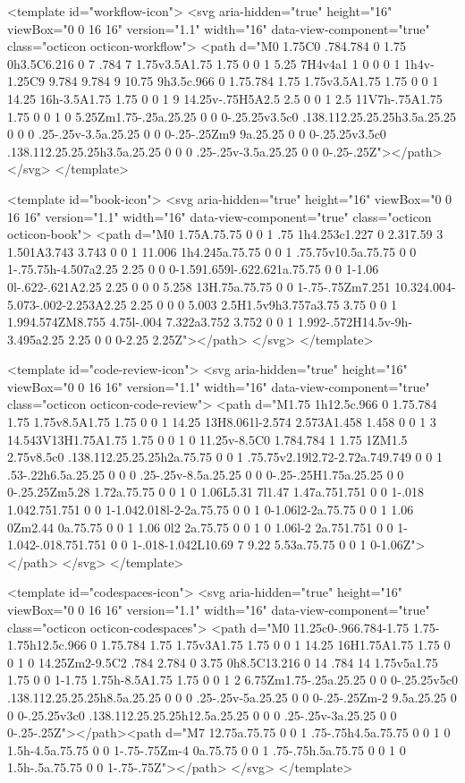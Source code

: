 {{<template id="workflow-icon">
  <svg aria-hidden="true" height="16" viewBox="0 0 16 16" version="1.1" width="16" data-view-component="true" class="octicon octicon-workflow">
    <path d="M0 1.75C0 .784.784 0 1.75 0h3.5C6.216 0 7 .784 7 1.75v3.5A1.75 1.75 0 0 1 5.25 7H4v4a1 1 0 0 0 1 1h4v-1.25C9 9.784 9.784 9 10.75 9h3.5c.966 0 1.75.784 1.75 1.75v3.5A1.75 1.75 0 0 1 14.25 16h-3.5A1.75 1.75 0 0 1 9 14.25v-.75H5A2.5 2.5 0 0 1 2.5 11V7h-.75A1.75 1.75 0 0 1 0 5.25Zm1.75-.25a.25.25 0 0 0-.25.25v3.5c0 .138.112.25.25.25h3.5a.25.25 0 0 0 .25-.25v-3.5a.25.25 0 0 0-.25-.25Zm9 9a.25.25 0 0 0-.25.25v3.5c0 .138.112.25.25.25h3.5a.25.25 0 0 0 .25-.25v-3.5a.25.25 0 0 0-.25-.25Z"></path>
</svg>
</template>

<template id="book-icon">
  <svg aria-hidden="true" height="16" viewBox="0 0 16 16" version="1.1" width="16" data-view-component="true" class="octicon octicon-book">
    <path d="M0 1.75A.75.75 0 0 1 .75 1h4.253c1.227 0 2.317.59 3 1.501A3.743 3.743 0 0 1 11.006 1h4.245a.75.75 0 0 1 .75.75v10.5a.75.75 0 0 1-.75.75h-4.507a2.25 2.25 0 0 0-1.591.659l-.622.621a.75.75 0 0 1-1.06 0l-.622-.621A2.25 2.25 0 0 0 5.258 13H.75a.75.75 0 0 1-.75-.75Zm7.251 10.324.004-5.073-.002-2.253A2.25 2.25 0 0 0 5.003 2.5H1.5v9h3.757a3.75 3.75 0 0 1 1.994.574ZM8.755 4.75l-.004 7.322a3.752 3.752 0 0 1 1.992-.572H14.5v-9h-3.495a2.25 2.25 0 0 0-2.25 2.25Z"></path>
</svg>
</template>

<template id="code-review-icon">
  <svg aria-hidden="true" height="16" viewBox="0 0 16 16" version="1.1" width="16" data-view-component="true" class="octicon octicon-code-review">
    <path d="M1.75 1h12.5c.966 0 1.75.784 1.75 1.75v8.5A1.75 1.75 0 0 1 14.25 13H8.061l-2.574 2.573A1.458 1.458 0 0 1 3 14.543V13H1.75A1.75 1.75 0 0 1 0 11.25v-8.5C0 1.784.784 1 1.75 1ZM1.5 2.75v8.5c0 .138.112.25.25.25h2a.75.75 0 0 1 .75.75v2.19l2.72-2.72a.749.749 0 0 1 .53-.22h6.5a.25.25 0 0 0 .25-.25v-8.5a.25.25 0 0 0-.25-.25H1.75a.25.25 0 0 0-.25.25Zm5.28 1.72a.75.75 0 0 1 0 1.06L5.31 7l1.47 1.47a.751.751 0 0 1-.018 1.042.751.751 0 0 1-1.042.018l-2-2a.75.75 0 0 1 0-1.06l2-2a.75.75 0 0 1 1.06 0Zm2.44 0a.75.75 0 0 1 1.06 0l2 2a.75.75 0 0 1 0 1.06l-2 2a.751.751 0 0 1-1.042-.018.751.751 0 0 1-.018-1.042L10.69 7 9.22 5.53a.75.75 0 0 1 0-1.06Z"></path>
</svg>
</template>

<template id="codespaces-icon">
  <svg aria-hidden="true" height="16" viewBox="0 0 16 16" version="1.1" width="16" data-view-component="true" class="octicon octicon-codespaces">
    <path d="M0 11.25c0-.966.784-1.75 1.75-1.75h12.5c.966 0 1.75.784 1.75 1.75v3A1.75 1.75 0 0 1 14.25 16H1.75A1.75 1.75 0 0 1 0 14.25Zm2-9.5C2 .784 2.784 0 3.75 0h8.5C13.216 0 14 .784 14 1.75v5a1.75 1.75 0 0 1-1.75 1.75h-8.5A1.75 1.75 0 0 1 2 6.75Zm1.75-.25a.25.25 0 0 0-.25.25v5c0 .138.112.25.25.25h8.5a.25.25 0 0 0 .25-.25v-5a.25.25 0 0 0-.25-.25Zm-2 9.5a.25.25 0 0 0-.25.25v3c0 .138.112.25.25.25h12.5a.25.25 0 0 0 .25-.25v-3a.25.25 0 0 0-.25-.25Z"></path><path d="M7 12.75a.75.75 0 0 1 .75-.75h4.5a.75.75 0 0 1 0 1.5h-4.5a.75.75 0 0 1-.75-.75Zm-4 0a.75.75 0 0 1 .75-.75h.5a.75.75 0 0 1 0 1.5h-.5a.75.75 0 0 1-.75-.75Z"></path>
</svg>
</template>

}}
